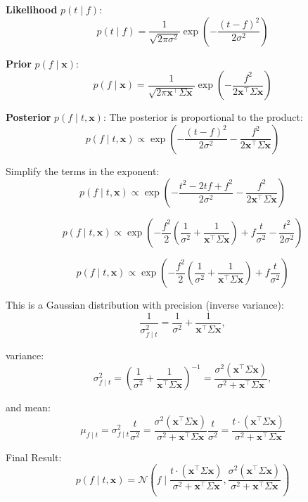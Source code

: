 \documentclass{article}
\begin{document}
\textbf{Likelihood} \( p(t \mid f) \):
\[
p(t \mid f) = \frac{1}{\sqrt{2\pi \sigma^2}} \exp\left( -\frac{(t - f)^2}{2\sigma^2} \right)
\]

\textbf{Prior} \( p(f \mid \mathbf{x}) \):
\[
p(f \mid \mathbf{x}) = \frac{1}{\sqrt{2\pi \mathbf{x}^\top \Sigma \mathbf{x}}} \exp\left( -\frac{f^2}{2 \mathbf{x}^\top \Sigma \mathbf{x}} \right)
\]

\textbf{Posterior} \( p(f \mid t, \mathbf{x}) \):
The posterior is proportional to the product:
\[
p(f \mid t, \mathbf{x}) \propto \exp\left( -\frac{(t - f)^2}{2\sigma^2} - \frac{f^2}{2 \mathbf{x}^\top \Sigma \mathbf{x}} \right)
\]

Simplify the terms in the exponent:
\[
p(f \mid t, \mathbf{x}) \propto \exp\left(
-\frac{t^2 - 2tf + f^2}{2\sigma^2} - \frac{f^2}{2 \mathbf{x}^\top \Sigma \mathbf{x}}
\right)
\]

\[
p(f \mid t, \mathbf{x}) \propto \exp\left(
-\frac{f^2}{2} \left( \frac{1}{\sigma^2} + \frac{1}{\mathbf{x}^\top \Sigma \mathbf{x}} \right)
+ f\frac{t}{\sigma^2}
- \frac{t^2}{2\sigma^2}
\right)
\]


\[
p(f \mid t, \mathbf{x}) \propto \exp\left(
-\frac{f^2}{2} \left( \frac{1}{\sigma^2} + \frac{1}{\mathbf{x}^\top \Sigma \mathbf{x}} \right)
+ f\frac{t}{\sigma^2}
\right)
\]

This is a Gaussian distribution with precision (inverse variance):
\[
\frac{1}{\sigma_{f \mid t}^2} = \frac{1}{\sigma^2} + \frac{1}{\mathbf{x}^\top \Sigma \mathbf{x}},
\]

variance:
\[
\sigma_{f \mid t}^2 = \left( \frac{1}{\sigma^2} + \frac{1}{\mathbf{x}^\top \Sigma \mathbf{x}} \right)^{-1} 
= \frac{\sigma^2 (\mathbf{x}^\top \Sigma \mathbf{x})}{\sigma^2 + \mathbf{x}^\top \Sigma \mathbf{x}},
\]

and mean:
\[
\mu_{f \mid t} =
\sigma_{f \mid t}^2 \frac{t}{\sigma^2}
=
\frac{\sigma^2 (\mathbf{x}^\top \Sigma \mathbf{x})}{\sigma^2 + \mathbf{x}^\top \Sigma \mathbf{x}} \frac{t}{\sigma^2}
= \frac{t \cdot (\mathbf{x}^\top \Sigma \mathbf{x})}{\sigma^2 + \mathbf{x}^\top \Sigma \mathbf{x}}
\]


Final Result:
\[
p(f \mid t, \mathbf{x}) = \mathcal{N}\left(f \mid \frac{t \cdot (\mathbf{x}^\top \Sigma \mathbf{x})}{\sigma^2 + \mathbf{x}^\top \Sigma \mathbf{x}}, \frac{\sigma^2 (\mathbf{x}^\top \Sigma \mathbf{x})}{\sigma^2 + \mathbf{x}^\top \Sigma \mathbf{x}} \right)
\]
\end{document}

